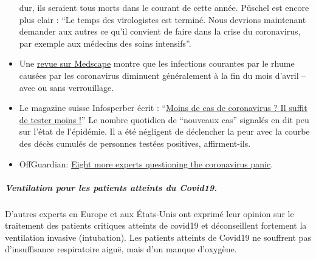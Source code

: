 \begin{itemize}
  dur, ils seraient tous morts dans le courant de cette année. Püschel
  est encore plus clair : ``Le temps des virologistes est terminé. Nous
  devrions maintenant demander aux autres ce qu'il convient de faire
  dans la crise du coronavirus, par exemple aux médecins des soins
  intensifs''.
\item
  Une
  \href{https://emedicine.medscape.com/article/227820-overview}{revue
  sur Medscape} montre que les infections courantes par le rhume causées
  par les coronavirus diminuent généralement à la fin du mois d'avril --
  avec ou sans verrouillage.
\item
  Le magazine suisse Infosperber écrit :
  ``\href{https://www.infosperber.ch/Artikel/Gesundheit/Weniger-Corona-Falle-Einfach-weniger-testen}{Moins
  de cas de coronavirus ? Il suffit de tester moins !}'' Le nombre
  quotidien de ``nouveaux cas'' signalés en dit peu sur l'état de
  l'épidémie. Il a été négligent de déclencher la peur avec la courbe
  des décès cumulés de personnes testées positives, affirment-ils.
\item
  OffGuardian:
  \href{https://off-guardian.org/2020/04/17/8-more-experts-questioning-the-coronavirus-panic/}{Eight
  more experts questioning the coronavirus panic}.
\end{itemize}

\hypertarget{ventilation-pour-les-patients-atteints-du-covid19}{%
\subparagraph{\texorpdfstring{\textbf{Ventilation pour les patients
atteints du
Covid19.}}{Ventilation pour les patients atteints du Covid19.}}\label{ventilation-pour-les-patients-atteints-du-covid19}}

D'autres experts en Europe et aux États-Unis ont exprimé leur opinion
sur le traitement des patients critiques atteints de covid19 et
déconseillent fortement la ventilation invasive (intubation). Les
patients atteints de Covid19 ne souffrent pas d'insuffisance
respiratoire aiguë, mais d'un manque d'oxygène.

